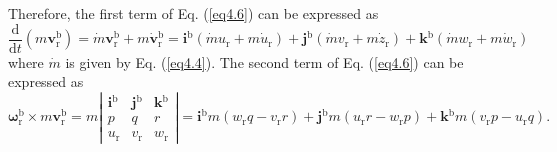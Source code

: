 Therefore, the first term of Eq. (\ref{eq4.6}) can be expressed as
\begin{equation}\label{eq4.9}
\frac{\mathrm{d}}{\mathrm{d}t}\left( m\mathbf{v}\mathrm{_r^b} \right) = \dot{ m}\mathbf{v}\mathrm{_r^b} + m\dot{\mathbf{v}}\mathrm{_r^b} = \mathbf{i}\mathrm{^b}\left( {\dot mu\mathrm{_r} + m\dot{u}\mathrm{_r}} \right) + \mathbf{j}\mathrm{^b}\left( \dot mv\mathrm{_r} + m\dot{z}\mathrm{_r} \right) + \mathbf{k}\mathrm{^b}\left( \dot mw\mathrm{_r}+ m{\dot w}\mathrm{_r} \right)
\end{equation}
where $\dot{ m}$ is given by Eq. (\ref{eq4.4}). The second term of Eq. (\ref{eq4.6}) can be expressed as
\begin{equation}\label{eq4.10}
\bm{\omega}\mathrm{_r^b} \times m\mathbf{v}\mathrm{_r^b} = m\left| {\begin{array}{*{20}{c}}
	\mathbf{i}\mathrm{^b}&\mathbf{j}\mathrm{^b}&\mathbf{k}\mathrm{^b}\\
	p&q&r\\
	u\mathrm{_r}&v\mathrm{_r}&w\mathrm{_r}
	\end{array}} \right| = \mathbf{i}\mathrm{^b}m\left( w\mathrm{_r}q - v\mathrm{_r}r \right) + \mathbf{j}\mathrm{^b}m\left( u\mathrm{_r}r - w\mathrm{_r}p\right) + \mathbf{k}\mathrm{^b}m\left( v\mathrm{_r}p - u\mathrm{_r}q \right).
\end{equation}

